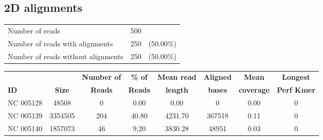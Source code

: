 \documentclass[a4paper,11pt,oneside]{article}
\begin{document}
\subsection*{2D alignments}
\vspace{-3mm}
\begin{table}[H]
{\footnotesize
\fontsize{9pt}{11pt}\selectfont
\begin{tabular}{l c c}
Number of reads & 500 & \\
Number of reads with alignments & 250 & (50.00\%) \\
Number of reads without alignments & 250 & (50.00\%) \\
\end{tabular}
}
\end{table}
\vspace{-10mm}
\begin{table}[H]
{\footnotesize
\fontsize{9pt}{11pt}\selectfont
\begin{tabular}{l c c c c c c c}
          &             & {\bf Number of} & {\bf \% of} & {\bf Mean read} & {\bf Aligned} & {\bf Mean} & {\bf Longest} \\
{\bf ID} & {\bf Size} & {\bf Reads}     & {\bf Reads}  & {\bf length}    & {\bf bases}   & {\bf coverage} & {\bf Perf Kmer} \\
NC 005128 & 48508 & 0 & 0.00 & 0.00 & 0 & 0.00 & 0 \\
NC 005139 & 3354505 & 204 & 40.80 & 4231.70 & 367518 & 0.11 & 0 \\
NC 005140 & 1857073 & 46 & 9.20 & 3830.28 & 48951 & 0.03 & 0 \\
\end{tabular}
}
\end{table}
\clearpage
\end{document}
